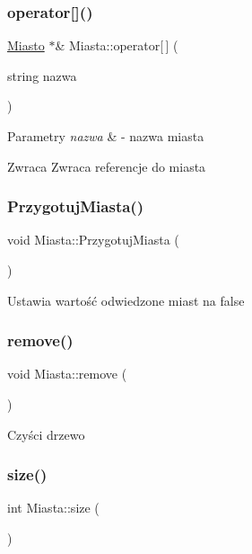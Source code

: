\subsubsection{\texorpdfstring{operator[]()}{operator[]()}}
{\footnotesize\ttfamily \mbox{\hyperlink{struct_miasto}{Miasto}} $\ast$\& Miasta\+::operator\mbox{[}$\,$\mbox{]} (\begin{DoxyParamCaption}\item[{string}]{nazwa }\end{DoxyParamCaption})}


\begin{DoxyParams}{Parametry}
{\em nazwa} & -\/ nazwa miasta \\
\hline
\end{DoxyParams}
\begin{DoxyReturn}{Zwraca}
Zwraca referencje do miasta 
\end{DoxyReturn}
\mbox{\label{class_miasta_a0ed245b8f82ddfde5299e173159cc4d5}} 
\subsubsection{\texorpdfstring{Przygotuj\+Miasta()}{PrzygotujMiasta()}}
{\footnotesize\ttfamily void Miasta\+::\+Przygotuj\+Miasta (\begin{DoxyParamCaption}{ }\end{DoxyParamCaption})}

Ustawia wartość odwiedzone miast na false \mbox{\label{class_miasta_a62181d2fa245835be892f2beb966e1e6}} 
\subsubsection{\texorpdfstring{remove()}{remove()}}
{\footnotesize\ttfamily void Miasta\+::remove (\begin{DoxyParamCaption}{ }\end{DoxyParamCaption})}

Czyści drzewo \mbox{\label{class_miasta_a1f77750958b72a576e37039157741b88}} 
\subsubsection{\texorpdfstring{size()}{size()}}
{\footnotesize\ttfamily int Miasta\+::size (\begin{DoxyParamCaption}{ }\end{DoxyParamCaption})}


